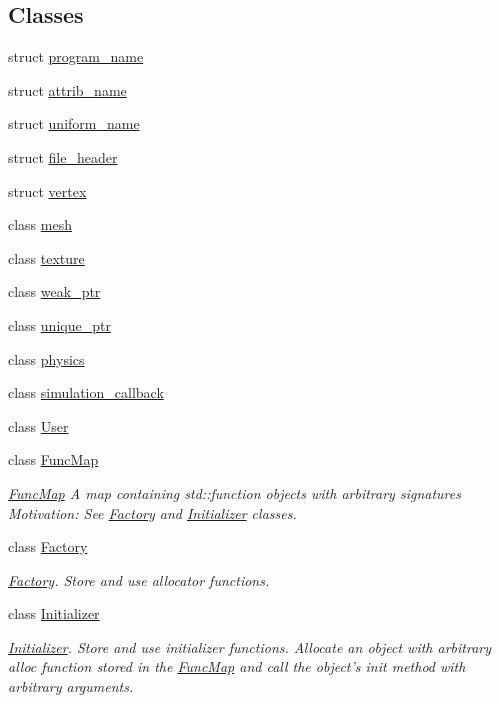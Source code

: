 \subsection*{\-Classes}
\begin{DoxyCompactItemize}
\item 
struct \hyperlink{structNeb_1_1program__name}{program\-\_\-name}
\item 
struct \hyperlink{structNeb_1_1attrib__name}{attrib\-\_\-name}
\item 
struct \hyperlink{structNeb_1_1uniform__name}{uniform\-\_\-name}
\item 
struct \hyperlink{structNeb_1_1file__header}{file\-\_\-header}
\item 
struct \hyperlink{structNeb_1_1vertex}{vertex}
\item 
class \hyperlink{classNeb_1_1mesh}{mesh}
\item 
class \hyperlink{classNeb_1_1texture}{texture}
\item 
class \hyperlink{classNeb_1_1weak__ptr}{weak\-\_\-ptr}
\item 
class \hyperlink{classNeb_1_1unique__ptr}{unique\-\_\-ptr}
\item 
class \hyperlink{classNeb_1_1physics}{physics}
\item 
class \hyperlink{classNeb_1_1simulation__callback}{simulation\-\_\-callback}
\item 
class \hyperlink{classNeb_1_1User}{\-User}
\item 
class \hyperlink{classNeb_1_1FuncMap}{\-Func\-Map}
\begin{DoxyCompactList}\small\item\em \hyperlink{classNeb_1_1FuncMap}{\-Func\-Map} \-A map containing {\ttfamily std\-::function} objects with arbitrary signatures \-Motivation\-: \-See \hyperlink{classNeb_1_1Factory}{\-Factory} and \hyperlink{classNeb_1_1Initializer}{\-Initializer} classes. \end{DoxyCompactList}\item 
class \hyperlink{classNeb_1_1Factory}{\-Factory}
\begin{DoxyCompactList}\small\item\em \hyperlink{classNeb_1_1Factory}{\-Factory}. \-Store and use allocator functions. \end{DoxyCompactList}\item 
class \hyperlink{classNeb_1_1Initializer}{\-Initializer}
\begin{DoxyCompactList}\small\item\em \hyperlink{classNeb_1_1Initializer}{\-Initializer}. \-Store and use initializer functions. \-Allocate an object with arbitrary alloc function stored in the \hyperlink{classNeb_1_1FuncMap}{\-Func\-Map} and call the object's {\ttfamily init} method with arbitrary arguments. \end{DoxyCompactList}\item 

\end{DoxyCompactItemize}
